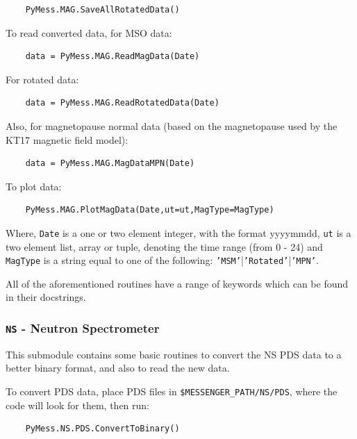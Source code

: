 	\begin{verbatim}
	PyMess.MAG.SaveAllRotatedData()
	\end{verbatim}
	
	To read converted data, for MSO data:
	
	\begin{verbatim}
	data = PyMess.MAG.ReadMagData(Date)
	\end{verbatim}
	
	For rotated data:
	
	\begin{verbatim}
	data = PyMess.MAG.ReadRotatedData(Date)
	\end{verbatim}
	
	Also, for magnetopause normal data (based on the magnetopause used by
	the KT17 magnetic field model):
	
	\begin{verbatim}
	data = PyMess.MAG.MagDataMPN(Date)
	\end{verbatim}
	
	To plot data:
	
	\begin{verbatim}
	PyMess.MAG.PlotMagData(Date,ut=ut,MagType=MagType)
	\end{verbatim}
	
	Where, \texttt{Date} is a one or two element integer, with the format yyyymmdd,
	\texttt{ut} is a two element list, array or tuple, denoting the time range 
	(from 0 - 24)  and \texttt{MagType} is a string equal to one of the following:
	\texttt{'MSM'}|\texttt{'Rotated'}|\texttt{'MPN'}.
	
	All of the aforementioned routines have a range of keywords which can be
	found in their docstrings.
	
	\subsubsection{\texttt{NS} - Neutron Spectrometer}
	
	This submodule contains some basic routines to convert the NS PDS data 
	to a better binary format, and also to read the new data.
	
	To convert PDS data, place PDS files in \texttt{\$MESSENGER\_PATH/NS/PDS}, where the code will look
	for them, then run:
	
	\begin{verbatim}
	PyMess.NS.PDS.ConvertToBinary()
	\end{verbatim}
	
